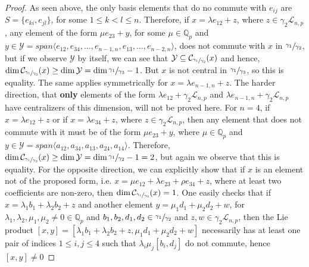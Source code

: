 \documentclass[12pt]{article}
\begin{document}
\begin{proof}
As seen above, the only basis elements that do no commute with $e_{ij}$ are $S=\{e_{ki},e_{jl}\}$, for some $1\leq k<l\leq n$. Therefore, if $x=\lambda e_{12}+z$, where $z\in\gamma_2\mathcal{L}_{n,p}$, any element of the form $\mu e_{23}+y$, for some $\mu\in\mathbb{Q}_p$ and $y\in\mathcal{Y}=span\langle e_{12},e_{34},\dots,e_{n-1,n},e_{13},\dots,e_{n-2,n}\rangle$, does not commute with $x$ in $\sfrac{\gamma_1}{\gamma_2}$, but if we observe $\mathcal{Y}$ by itself, we can see that $\mathcal{Y}\subseteq\mathcal{C}_{\sfrac{\gamma_1}{\gamma_2}}(x)$ and hence, $\dim\mathcal{C}_{\sfrac{\gamma_1}{\gamma_2}}(x)\geq\dim\mathcal{Y}=\dim\sfrac{\gamma_1}{\gamma_3}-1$. But $x$ is not central in $\sfrac{\gamma_1}{\gamma_3}$, so this is equality. The same applies symmetrically for $x=\lambda e_{n-1,n}+z$. The harder direction, that \textbf{only} elements of the form $\lambda e_{12}+\gamma_2\mathcal{L}_{n,p}$ and $\lambda e_{n-1,n}+\gamma_2\mathcal{L}_{n,p}$ have centralizers of this dimension, will not be proved here. For $n=4$, if $x=\lambda e_{12}+z$ or if $x=\lambda e_{34}+z$, where $z\in\gamma_2\mathcal{L}_{n,p}$, then any element that does not commute with it must be of the form $\mu e_{23}+y$, where $\mu\in\mathbb{Q}_p$ and $y\in\mathcal{Y}=span\langle a_{12},a_{34},a_{13},a_{24},a_{14}\rangle$. Therefore, $\dim\mathcal{C}_{\sfrac{\gamma_1}{\gamma_3}}(x)\geq\dim\mathcal{Y}=\dim\sfrac{\gamma_1}{\gamma_2}-1=2$, but again we observe that this is equality. For the opposite direction, we can explicitly show that if $x$ is an element not of the proposed form, i.e. $x=\mu e_{12}+\lambda e_{23}+\rho e_{34}+z$, where at least two coefficients are non-zero, then $\dim\mathcal{C}_{\sfrac{\gamma_1}{\gamma_3}}(x)=1$. One easily checks that if $x=\lambda_1 b_1+\lambda_2 b_2+z$ and another element $y=\mu_1 d_1+\mu_2 d_2+w$, for $\lambda_1,\lambda_2,\mu_1,\mu_2\neq 0\in\mathbb{Q}_p$ and $b_1,b_2,d_1,d_2\in\sfrac{\gamma_1}{\gamma_2}$ and $z,w\in\gamma_2\mathcal{L}_{n,p}$, then the Lie product $[x,y]=[\lambda_1 b_1+\lambda_2 b_2+z,\mu_1 d_1+\mu_2 d_2+w]$ necessarily has at least one pair of indices $1\leq i,j\leq 4$ such that $\lambda_i\mu_j[b_i,d_j]$ do not commute, hence $[x,y]\neq 0$
\end{proof}
\end{document}
